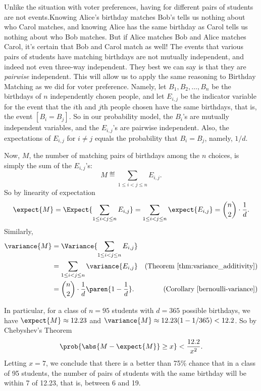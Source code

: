 Unlike the situation with voter preferences, having  for different pairs of students are not  events.\iffalse---as explained in
Section~\ref{birthday_principle_sec} and proved in
Problem~\ref{PS_equal_birthdays}.\fi Knowing Alice's birthday matches
Bob's tells us nothing about who Carol matches, and knowing Alice has
the same birthday as Carol tells us nothing about who Bob matches. But
if Alice matches Bob and Alice matches Carol, it's certain that Bob
and Carol match as well!  The events that various pairs of students
have matching birthdays are not mutually independent, and indeed not
even three-way independent.  They best we can say is that they are
 \emph{pairwise} independent.  This will
allow us to apply the same reasoning to Birthday Matching as we did
for voter preference.  Namely, let $B_1,B_2,\dots,B_n$ be the
birthdays of $n$ independently chosen people, and let $E_{i,j}$ be the
indicator variable for the event that the $i$th and $j$th people
chosen have the same birthdays, that is, the event $[B_i = B_j]$.  So
in our probability model, the $B_i$'s are mutually independent
variables, and the $E_{i,j}$'s are pairwise independent.  Also, the
expectations of $E_{i,j}$ for $i \neq j$ equals the probability that
$B_i = B_j$, namely, $1/d$.

Now, $M$, the number of matching pairs of birthdays among the $n$
choices, is simply the sum of the $E_{i,j}$'s:
\begin{equation}\label{Vn}
M \eqdef \sum_{1\le i < j \le n} E_{i,j}.
\end{equation}
So by linearity of expectation
\[
\expect{M} = \Expect{\sum_{1\le i < j \le n} E_{i,j}} = 
               \sum_{1\le i < j \le n} \expect{E_{i,j}} =
               \binom{n}{2}\cdot \frac{1}{d}.
\]
Similarly,
\begin{align*}
\variance{M}
   & = \Variance{\sum_{1\le i < j \le n} E_{i,j}}\\
   & = \sum_{1\le i < j \le n} \variance{E_{i,j}}
           & \text{(Theorem~\ref{thm:variance_additivity})}\\
   & = \binom{n}{2} \cdot \frac{1}{d}\paren{1-\frac{1}{d}}.
           & \text{(Corollary~\ref{bernoulli-variance})}
\end{align*} 

In particular, for a class of $n= 95$ students with $d=365$ possible
birthdays, we have $\expect{M} \approx 12.23$ and $\variance{M} \approx 12.23 (1-
1/365) < 12.2$.  So by Chebyshev's Theorem
\[
\prob{\abs{M - \expect{M}} \geq x} < \frac{12.2}{x^2}.
\]
Letting $x=7$, we conclude that there is a better than 75\% chance
that in a class of 95 students, the number of pairs of students with
the same birthday will be within 7 of 12.23, that is, between 6 and 19.


